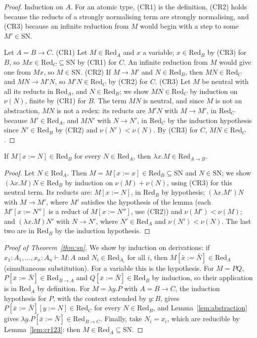 \begin{proof}
Induction on $A$. For an atomic type, (CR1) is the definition, (CR2) holds because the reducts of a strongly normalising term are strongly normalising, and (CR3) because an infinite reduction from $M$ would begin with a step to some $M'\in\mathrm{SN}$.

Let $A=B\to C$. (CR1) Let $M\in\mathrm{Red}_A$ and $x$ a variable; $x\in\mathrm{Red}_B$ by (CR3) for $B$, so $Mx\in\mathrm{Red}_C\subseteq\mathrm{SN}$ by (CR1) for $C$. An infinite reduction from $M$ would give one from $Mx$, so $M\in\mathrm{SN}$. (CR2) If $M\to M'$ and $N\in\mathrm{Red}_B$, then $MN\in\mathrm{Red}_C$ and $MN\to M'N$, so $M'N\in\mathrm{Red}_C$ by (CR2) for $C$. (CR3) Let $M$ be neutral with all its reducts in $\mathrm{Red}_A$, and $N\in\mathrm{Red}_B$; we show $MN\in\mathrm{Red}_C$ by induction on $\nu(N)$, finite by (CR1) for $B$. The term $MN$ is neutral, and since $M$ is not an abstraction, $MN$ is not a redex: its reducts are $M'N$ with $M\to M'$, in $\mathrm{Red}_C$ because $M'\in\mathrm{Red}_A$, and $MN'$ with $N\to N'$, in $\mathrm{Red}_C$ by the induction hypothesis since $N'\in\mathrm{Red}_B$ by (CR2) and $\nu(N')<\nu(N)$. By (CR3) for $C$, $MN\in\mathrm{Red}_C$.
\end{proof}

\begin{lemma}\label{lem:abstraction}
If $M[x:=N]\in\mathrm{Red}_B$ for every $N\in\mathrm{Red}_A$, then $\lambda x.M\in\mathrm{Red}_{A\to B}$.
\end{lemma}

\begin{proof}
Let $N\in\mathrm{Red}_A$. Then $M=M[x:=x]\in\mathrm{Red}_B\subseteq\mathrm{SN}$ and $N\in\mathrm{SN}$; we show $(\lambda x.M)N\in\mathrm{Red}_B$ by induction on $\nu(M)+\nu(N)$, using (CR3) for this neutral term. Its reducts are: $M[x:=N]$, in $\mathrm{Red}_B$ by hypothesis; $(\lambda x.M')N$ with $M\to M'$, where $M'$ satisfies the hypothesis of the lemma (each $M'[x:=N'']$ is a reduct of $M[x:=N'']$, use (CR2)) and $\nu(M')<\nu(M)$; and $(\lambda x.M)N'$ with $N\to N'$, where $N'\in\mathrm{Red}_A$ and $\nu(N')<\nu(N)$. The last two are in $\mathrm{Red}_B$ by the induction hypothesis.
\end{proof}

\begin{proof}[Proof of Theorem~\ref{thm:sn}]
We show by induction on derivations: if $x_1:A_1,\dots,x_n:A_n\vdash M:A$ and $N_i\in\mathrm{Red}_{A_i}$ for all $i$, then $M[\bar x:=\bar N]\in\mathrm{Red}_A$ (simultaneous substitution). For a variable this is the hypothesis. For $M=PQ$, $P[\bar x:=\bar N]\in\mathrm{Red}_{B\to A}$ and $Q[\bar x:=\bar N]\in\mathrm{Red}_B$ by induction, so their application is in $\mathrm{Red}_A$ by definition. For $M=\lambda y.P$ with $A=B\to C$, the induction hypothesis for $P$, with the context extended by $y:B$, gives $P[\bar x:=\bar N][y:=N]\in\mathrm{Red}_C$ for every $N\in\mathrm{Red}_B$, and Lemma~\ref{lem:abstraction} gives $\lambda y.P[\bar x:=\bar N]\in\mathrm{Red}_{B\to C}$. Finally, take $N_i=x_i$, which are reducible by Lemma~\ref{lem:cr123}: then $M\in\mathrm{Red}_A\subseteq\mathrm{SN}$.
\end{proof}

